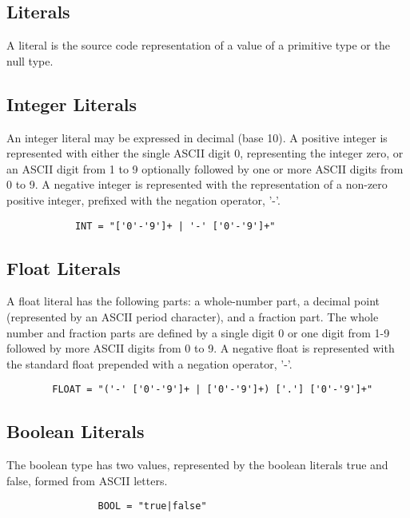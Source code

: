 \begin{homeworkProblem}
	
	\section{Literals}
	A literal is the source code representation of a value of a primitive type or the null type.
	
	\subsection{Integer Literals}
	An integer literal may be expressed in decimal (base 10). A positive integer is represented with either the single ASCII digit 0, representing the integer zero, or an ASCII digit from 1 to 9 optionally followed by one or more ASCII digits from 0 to 9. A negative integer is represented with the representation of a non-zero positive integer, prefixed with the negation operator, '-'.
	
	\begin{verbatim}
			INT = "['0'-'9']+ | '-' ['0'-'9']+"
	\end{verbatim}
	
	\subsection{Float Literals}
	A float literal has the following parts: a whole-number part, a decimal point (represented by an ASCII period character), and a fraction part. The whole number and fraction parts are defined by a single digit 0 or one digit from 1-9 followed by more ASCII digits from 0 to 9. A negative float is represented with the standard float prepended with a negation operator, '-'.
	\begin{verbatim}
		FLOAT = "('-' ['0'-'9']+ | ['0'-'9']+) ['.'] ['0'-'9']+"
	\end{verbatim}
	
	\subsection{Boolean Literals}
	The boolean type has two values, represented by the boolean literals true and false, formed from ASCII letters.
	\begin{verbatim}
				BOOL = "true|false"
	\end{verbatim}
	

\end{homeworkProblem}
